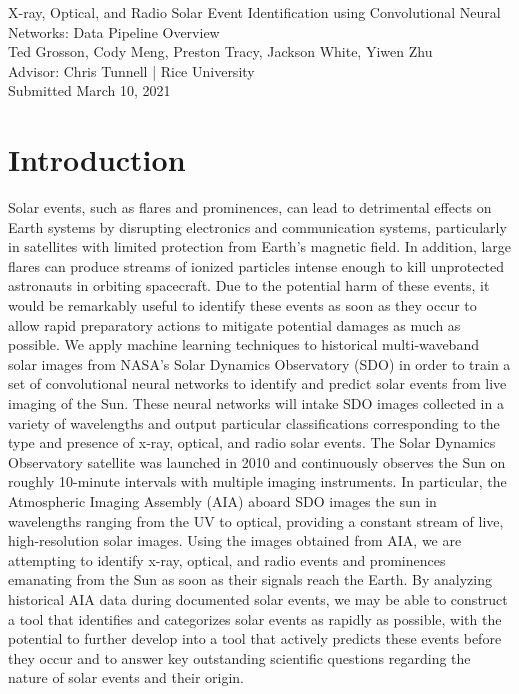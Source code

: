 \documentclass[12pt, letterpaper]{article}
\begin{document}
\begin{center}
    \Large X-ray, Optical, and Radio Solar Event Identification using Convolutional Neural Networks: Data Pipeline Overview \\
    \vspace{.6em}
    \large Ted Grosson, Cody Meng, Preston Tracy, Jackson White, Yiwen Zhu
    \vspace{.3em}
    \\ Advisor: Chris Tunnell | Rice University
    \vspace{.5em}
    \normalsize
    \\ Submitted March 10, 2021
    \\
\end{center} \vspace{-2.3em}


\section*{Introduction}

Solar events, such as flares and prominences, can lead to detrimental effects on Earth systems by disrupting electronics and communication systems, particularly in satellites with limited protection from Earth’s magnetic field. In addition, large flares can produce streams of ionized particles intense enough to kill unprotected astronauts in orbiting spacecraft. Due to the potential harm of these events, it would be remarkably useful to identify these events as soon as they occur to allow rapid preparatory actions to mitigate potential damages as much as possible. We apply machine learning techniques to historical multi-waveband solar images from NASA’s Solar Dynamics Observatory (SDO) in order to train a set of convolutional neural networks to identify and predict solar events from live imaging of the Sun. These neural networks will intake SDO images collected in a variety of wavelengths and output particular classifications corresponding to the type and presence of x-ray, optical, and radio solar events. The Solar Dynamics Observatory satellite was launched in 2010 and continuously observes the Sun on roughly 10-minute intervals with multiple imaging instruments. In particular, the Atmospheric Imaging Assembly (AIA) aboard SDO images the sun in wavelengths ranging from the UV to optical, providing a constant stream of live, high-resolution solar images\cite{Pesnell2012}. Using the images obtained from AIA, we are attempting to identify x-ray, optical, and radio events and prominences emanating from the Sun as soon as their signals reach the Earth. By analyzing historical AIA data during documented solar events, we may be able to construct a tool that identifies and categorizes solar events as rapidly as possible, with the potential to further develop into a tool that actively predicts these events before they occur and to answer key outstanding scientific questions regarding the nature of solar events and their origin. 
\end{document}
